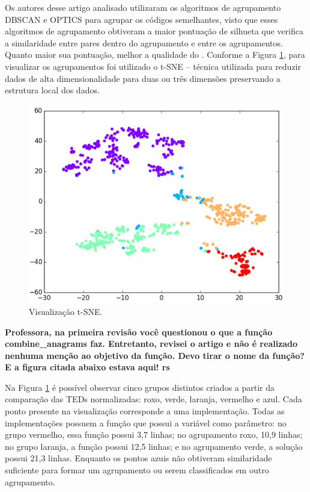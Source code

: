 	    Os autores desse artigo analisado utilizaram os algoritmos de agrupamento
	    DBSCAN \cite{Ester1996} e OPTICS \cite{Ankerst1999} para agrupar os códigos
	    semelhantes, visto que esses algoritmos de agrupamento obtiveram a maior
	    pontuação de silhueta que verifica a similaridade entre pares dentro do
	    agrupamento e entre os agrupamentos. Quanto maior sua pontuação, melhor a
	    qualidade do . Conforme a Figura \ref{fig:t-SNE}, para
	    visualizar os agrupamentos foi utilizado o t-SNE \cite{maaten2008} – técnica
	    utilizada para reduzir dados de alta dimensionalidade para duas ou três
	    dimensões preservando a estrutura local dos dados.
	    
	    \begin{figure}[ht]
	        \centering
	        \includegraphics[scale=0.5]{imagem/visualizacao-tSNE.png}
	        \captionsetup{justification=centering}
	        \caption{Visualização t-SNE.}
	        \label{fig:t-SNE}
	    \end{figure}
	    
	    \textbf{Professora, na primeira revisão você questionou o que a função
	    	combine\_anagrams faz. Entretanto, revisei o artigo e não é realizado
	    	nenhuma menção ao objetivo da função. Devo tirar o nome da função? E
	    	a figura citada abaixo estava aqui! rs}
	    
	    Na Figura \ref{fig:t-SNE} é possível observar cinco grupos distintos
	    criados a partir da comparação das TEDs normalizadas: roxo, verde, laranja,
	    vermelho e azul. Cada ponto presente na visualização corresponde a uma
	    implementação. Todas as implementações possuem a função 
	    que possui a variável  como parâmetro: no grupo vermelho,
	    essa função possui 3,7 linhas; no agrupamento roxo, 10,9 linhas; no
	    grupo laranja, a função possui 12,5 linhas; e no agrupamento verde,
	    a solução possui 21,3 linhas. Enquanto os pontos azuis não obtiveram
	    similaridade suficiente para formar um agrupamento ou serem classificados
	    em outro agrupamento. 
	
